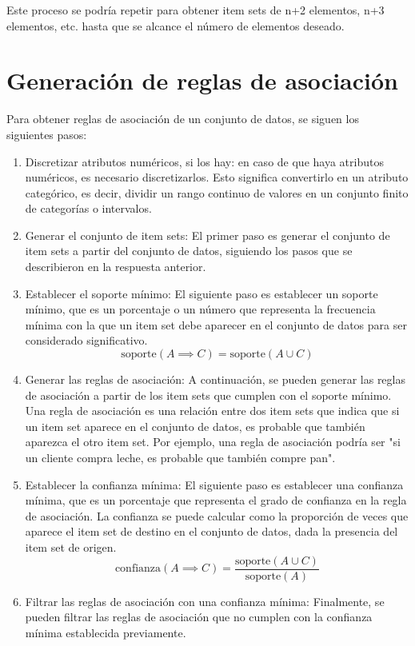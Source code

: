 Este proceso se podría repetir para obtener item sets de n+2 elementos, n+3 elementos, etc. hasta que se alcance el número de elementos deseado.

\section{Generación de reglas de asociación}
Para obtener reglas de asociación de un conjunto de datos, se siguen los siguientes pasos: \cite{pdf_reglas}

\begin{enumerate}
    \item Discretizar atributos numéricos, si los hay: en caso de que haya atributos numéricos, es necesario discretizarlos. Esto significa convertirlo en un atributo categórico, es decir, dividir un rango continuo de valores en un conjunto finito de categorías o intervalos.
    \item Generar el conjunto de item sets: El primer paso es generar el conjunto de item sets a partir del conjunto de datos, siguiendo los pasos que se describieron en la respuesta anterior.
    \item Establecer el soporte mínimo: El siguiente paso es establecer un soporte mínimo, que es un porcentaje o un número que representa la frecuencia mínima con la que un item set debe aparecer en el conjunto de datos para ser considerado significativo. 
    $$\text{soporte}(A \implies C) = \text{soporte}(A \cup C)$$
 
    \item Generar las reglas de asociación: A continuación, se pueden generar las reglas de asociación a partir de los item sets que cumplen con el soporte mínimo. Una regla de asociación es una relación entre dos item sets que indica que si un item set aparece en el conjunto de datos, es probable que también aparezca el otro item set. Por ejemplo, una regla de asociación podría ser "si un cliente compra leche, es probable que también compre pan".
    \item Establecer la confianza mínima: El siguiente paso es establecer una confianza mínima, que es un porcentaje que representa el grado de confianza en la regla de asociación. La confianza se puede calcular como la proporción de veces que aparece el item set de destino en el conjunto de datos, dada la presencia del item set de origen.
    $$\text{confianza}(A \implies C) = \frac{\text{soporte}(A \cup C)}{\text{soporte}(A)}$$
    
    \item Filtrar las reglas de asociación con una confianza mínima: Finalmente, se pueden filtrar las reglas de asociación que no cumplen con la confianza mínima establecida previamente.
\end{enumerate}

